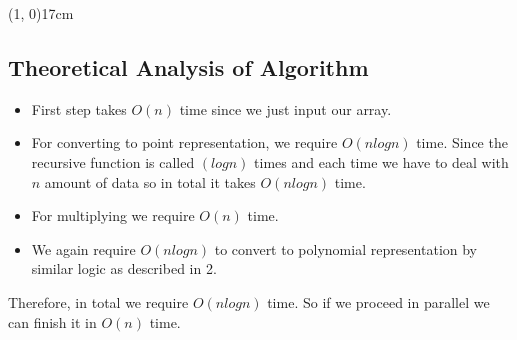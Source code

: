 \documentclass[10pt]{article}
\begin{document}
\begin{center}
	\line(1, 0){17cm}
\end{center}

\begin{center}
 \section*{Theoretical Analysis of Algorithm}
 \end{center}
 
 \begin{itemize}
 
\item First step takes $O(n)$ time since we just input our array.

\item For converting to point representation, we require $O(nlogn)$ time. Since the recursive function is called $(logn)$ times and each time we have to deal with $n$ amount of data so in total it takes $O(nlogn)$ time.

\item For multiplying we require $O(n)$ time.

\item We again require $O(nlogn)$ to convert to polynomial representation by similar logic as described in 2.

\end{itemize}
Therefore, in total we require $O(nlogn)$ time. So if we proceed in parallel we can finish it in $O(n)$ time.
\end{document}
